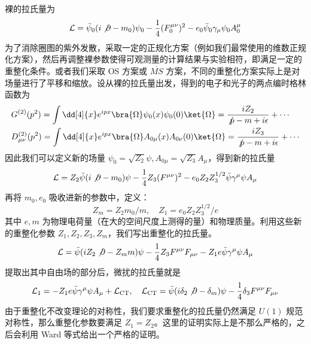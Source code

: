 

裸的拉氏量为
\begin{equation}
\begin{aligned}
\mathcal{L}=
\bar{\psi}_0 (i\not\partial -m_0)\psi_0 -\frac{1}{4}(F_0^{\mu\nu})^2 - e_0\bar\psi_0 \gamma_\mu\psi_0 A_0^\mu
\end{aligned}
\end{equation}
为了消除圈图的紫外发散，采取一定的正规化方案（例如我们最常使用的维数正规化方案），然后再调整裸参数使得可观测量的计算结果与实验相符，即满足一定的重整化条件。或者我们采取 OS 方案或 $\overline{MS}$ 方案，不同的重整化方案实际上是对场量进行了平移和缩放。设从裸的拉氏量出发，得到的电子和光子的两点编时格林函数为
\begin{equation}
\begin{aligned}
&G^{(2)}(p^2)=\int\dd[4]{x} e^{ipx} \bra{\Omega}\psi_0(x)\psi_0(0)\ket{\Omega}=\frac{iZ_2}{\not p-m+i\epsilon} + \cdots\\
&D_{\mu\nu}^{(2)}(p^2)=\int\dd[4]{x} e^{ipx} \bra{\Omega}A_{0\mu}(x)A_{0\nu}(0)\ket{\Omega}=\frac{iZ_3}{\not p-m+i\epsilon}+\cdots
\end{aligned}
\end{equation}
因此我们可以定义新的场量 $\psi_0=\sqrt{Z_2} \psi,A_{0\mu} = \sqrt{Z_3} A_\mu$，得到新的拉氏量
\begin{equation}
\mathcal{L} = Z_2\bar\psi (i\not\partial - m_0)\psi - \frac{1}{4}Z_3 (F^{\mu\nu})^2-e_0Z_2Z_3^{1/2} \bar\psi \gamma^\mu\psi A_\mu
\end{equation}
再将 $m_0,e_0$ 吸收进新的参数中，定义：
\begin{equation}
Z_m = Z_2 m_0 / m,\quad Z_1 = e_0Z_2Z_3^{1/2} / e
\end{equation}
其中 $e,m$ 为物理电荷量（在大的空间尺度上测得的量）和物理质量。利用这些新的重整化参数 $Z_1,Z_2,Z_3,Z_m$，我们写出重整化的拉氏量。
\begin{equation}
\begin{aligned}
\mathcal{L} = \bar\psi (iZ_2\not\partial - Z_m m)\psi -\frac{1}{4}Z_3F^{\mu\nu}F_{\mu\nu}-Z_1 e\bar\psi \gamma^\mu \psi A_\mu
\end{aligned}
\end{equation}
提取出其中自由场的部分后，微扰的拉氏量就是
\begin{equation}
\mathcal{L}_1 = - Z_1 e \bar\psi \gamma^\mu\psi A_\mu + \mathcal{L}_\text{CT},\quad \mathcal{L}_\text{CT} = \bar\psi (i\delta_2 \not\partial - \delta_m)\psi - \frac{1}{4}\delta_3 F^{\mu\nu}F_{\mu\nu}
\end{equation}
由于重整化不改变理论的对称性，我们要求重整化的拉氏量仍然满足 $U(1)$ 规范对称性，那么重整化参数要满足 $Z_1=Z_2$。这里的证明实际上是不那么严格的，之后会利用 Ward 等式给出一个严格的证明。
